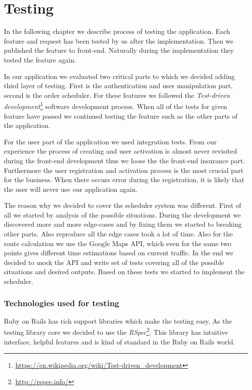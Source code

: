 \chapter{Testing}
In the following chapter we describe process of testing the application. Each feature and request has been tested by us after the implementation. Then we published the feature to front-end. Naturally during the implementation they tested the feature again.

 In our application we evaluated two critical parts to which we decided adding third layer of testing. First is the authentication and user manipulation part, second is the order scheduler. For these features we followed the \textit{Test-driven development}\footnote{\url{https://en.wikipedia.org/wiki/Test-driven_development}} software development process. When all of the tests for given feature have passed we continued testing the feature such as the other parts of the application.

 For the user part of the application we used integration tests. From our experience the process of creating and user activation is almost never revisited during the front-end development thus we loose the the front-end insurance part. Furthermore the user registration and activation process is the most crucial part for the business. When there occurs error during the registration, it is likely that the user will never use our application again.  
  
 The reason why we decided to cover the scheduler system was different. First of all we started by analysis of the possible situations. During the development we discovered more and more edge-cases and by fixing them we started to breaking other parts. Also reproduce all the edge cases took a lot of time. Also for the route calculation we use the Google Maps API, which even for the same two points gives different time estimations based on current traffic. In the end we decided to mock the API and write set of tests covering all of the possible situations and desired outputs. Based on these tests we started to implement the scheduler. 
 

\subsection{Technologies used for testing}

Ruby on Rails has rich support libraries which make the testing easy. As the testing library core we decided to use the \textit{RSpec}\footnote{\url{http://rspec.info/}}. This library has intuitive interface, helpful features and is kind of standard in the Ruby on Rails world.


